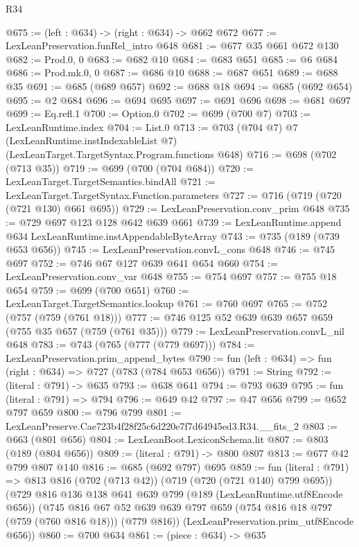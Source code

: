 \begin{lexlean}{R34}
\begin{coremodule}
@675 := (left : @634) -> (right : @634) -> @662 @672
@677 := LexLeanPreservation.funRel_intro @648
@681 := @677 @35 @661 @672 @130
@682 := Prod.{0, 0}
@683 := @682 @10
@684 := @683 @651
@685 := @6 @684
@686 := Prod.mk.{0, 0}
@687 := @686 @10
@688 := @687 @651
@689 := @688 @35
@691 := @685 (@689 @657)
@692 := @688 @18
@694 := @685 (@692 @654)
@695 := @2 @684
@696 := @694 @695
@697 := @691 @696
@698 := @681 @697
@699 := Eq.refl.{1}
@700 := Option.{0}
@702 := @699 (@700 @7)
@703 := LexLeanRuntime.index
@704 := List.{0}
@713 := @703
    (@704 @7)
    @7
    (LexLeanRuntime.instIndexableList @7)
    (LexLeanTarget.TargetSyntax.Program.functions @648)
@716 := @698 (@702 (@713 @35))
@719 := @699 (@700 (@704 @684))
@720 := LexLeanTarget.TargetSemantics.bindAll
@721 := LexLeanTarget.TargetSyntax.Function.parameters
@727 := @716 (@719 (@720 (@721 @130) @661 @695))
@729 := LexLeanPreservation.conv_prim @648
@735 := @729 @697 @123 @128 @642 @639 @661
@739 := LexLeanRuntime.append @634 LexLeanRuntime.instAppendableByteArray
@743 := @735 (@189 (@739 @653 @656))
@745 := LexLeanPreservation.convL_cons @648
@746 := @745 @697
@752 := @746 @67 @127 @639 @641 @654 @660
@754 := LexLeanPreservation.conv_var @648
@755 := @754 @697
@757 := @755 @18 @654
@759 := @699 (@700 @651)
@760 := LexLeanTarget.TargetSemantics.lookup
@761 := @760 @697
@765 := @752 (@757 (@759 (@761 @18)))
@777 := @746 @125 @52 @639 @639 @657 @659 (@755 @35 @657 (@759 (@761 @35)))
@779 := LexLeanPreservation.convL_nil @648
@783 := @743 (@765 (@777 (@779 @697)))
@784 := LexLeanPreservation.prim_append_bytes
@790 := fun (left : @634) => fun (right : @634) => @727 (@783 (@784 @653 @656))
@791 := String
@792 := (literal : @791) -> @635
@793 := @638 @641
@794 := @793 @639
@795 := fun (literal : @791) => @794
@796 := @649 @42
@797 := @47 @656
@799 := @652 @797 @659
@800 := @796 @799
@801 := LexLeanPreserve.Cae723b4f28f25c6d220e7f7d64945ed3.R34.__fits_2
@803 := @663 (@801 @656)
@804 := LexLeanBoot.LexiconSchema.lit
@807 := @803 (@189 (@804 @656))
@809 := (literal : @791) -> @800 @807
@813 := @677 @42 @799 @807 @140
@816 := @685 (@692 @797) @695
@859 := fun (literal : @791) =>
  @813
    @816
    (@702 (@713 @42))
    (@719 (@720 (@721 @140) @799 @695))
    (@729
      @816
      @136
      @138
      @641
      @639
      @799
      (@189 (LexLeanRuntime.utf8Encode @656))
      (@745
        @816
        @67
        @52
        @639
        @639
        @797
        @659
        (@754 @816 @18 @797 (@759 (@760 @816 @18)))
        (@779 @816))
      (LexLeanPreservation.prim_utf8Encode @656))
@860 := @700 @634
@861 := (piece : @634) -> @635

\end{coremodule}
\end{lexlean}
